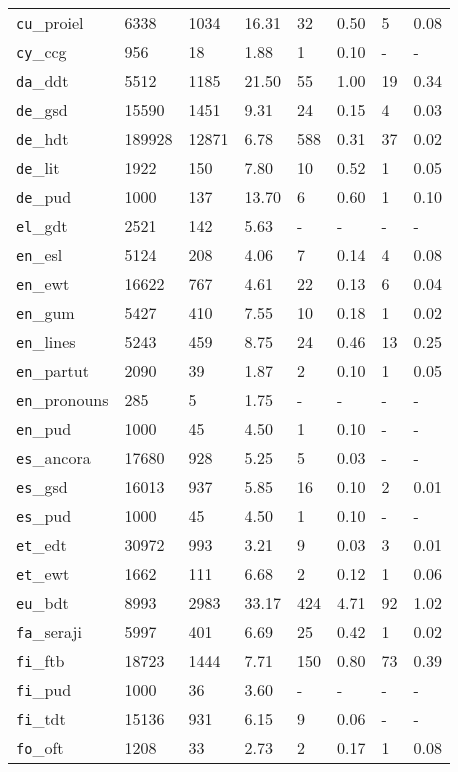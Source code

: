 \begin{longtable}{|l|l|l|l|l|l|l|l|}
\texttt{cu}\_proiel & 6338 & 1034 & 16.31 & 32 & 0.50 & 5 & 0.08\\
\texttt{cy}\_ccg & 956 & 18 & 1.88 & 1 & 0.10 & - & -\\
\texttt{da}\_ddt & 5512 & 1185 & 21.50 & 55 & 1.00 & 19 & 0.34\\
\texttt{de}\_gsd & 15590 & 1451 & 9.31 & 24 & 0.15 & 4 & 0.03\\
\texttt{de}\_hdt & 189928 & 12871 & 6.78 & 588 & 0.31 & 37 & 0.02\\
\texttt{de}\_lit & 1922 & 150 & 7.80 & 10 & 0.52 & 1 & 0.05\\
\texttt{de}\_pud & 1000 & 137 & 13.70 & 6 & 0.60 & 1 & 0.10\\
\texttt{el}\_gdt & 2521 & 142 & 5.63 & - & - & - & -\\
\texttt{en}\_esl & 5124 & 208 & 4.06 & 7 & 0.14 & 4 & 0.08\\
\texttt{en}\_ewt & 16622 & 767 & 4.61 & 22 & 0.13 & 6 & 0.04\\
\texttt{en}\_gum & 5427 & 410 & 7.55 & 10 & 0.18 & 1 & 0.02\\
\texttt{en}\_lines & 5243 & 459 & 8.75 & 24 & 0.46 & 13 & 0.25\\
\texttt{en}\_partut & 2090 & 39 & 1.87 & 2 & 0.10 & 1 & 0.05\\
\texttt{en}\_pronouns & 285 & 5 & 1.75 & - & - & - & -\\
\texttt{en}\_pud & 1000 & 45 & 4.50 & 1 & 0.10 & - & -\\
\texttt{es}\_ancora & 17680 & 928 & 5.25 & 5 & 0.03 & - & -\\
\texttt{es}\_gsd & 16013 & 937 & 5.85 & 16 & 0.10 & 2 & 0.01\\
\texttt{es}\_pud & 1000 & 45 & 4.50 & 1 & 0.10 & - & -\\
\texttt{et}\_edt & 30972 & 993 & 3.21 & 9 & 0.03 & 3 & 0.01\\
\texttt{et}\_ewt & 1662 & 111 & 6.68 & 2 & 0.12 & 1 & 0.06\\
\texttt{eu}\_bdt & 8993 & 2983 & 33.17 & 424 & 4.71 & 92 & 1.02\\
\texttt{fa}\_seraji & 5997 & 401 & 6.69 & 25 & 0.42 & 1 & 0.02\\
\texttt{fi}\_ftb & 18723 & 1444 & 7.71 & 150 & 0.80 & 73 & 0.39\\
\texttt{fi}\_pud & 1000 & 36 & 3.60 & - & - & - & -\\
\texttt{fi}\_tdt & 15136 & 931 & 6.15 & 9 & 0.06 & - & -\\
\texttt{fo}\_oft & 1208 & 33 & 2.73 & 2 & 0.17 & 1 & 0.08\\

\end{longtable}
